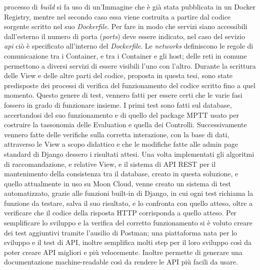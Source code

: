 processo di \textit{build} si fa uso di un'Immagine che è già stata pubblicata in un Docker Registry, mentre nel secondo caso essa viene costruita 
a partire dal codice sorgente scritto nel suo \textit{Dockerfile}. Per fare in modo che servizi siano accessibili dall'esterno il numero di porta 
(\textit{ports}) deve essere indicato, nel caso del sevizio \textit{api} ciò è specificato all'interno del \textit{Dockerfile}.\hfill\break
Le \textit{networks} definiscono le regole di comunicazione tra i Container, e tra i Container e gli host; delle reti in comune 
permettono a diversi servizi di essere visibili l'uno con l'altro.
%
\vspace{1.5 cm}
\hfill\break
Durante la scrittura delle View e delle altre parti del codice, proposta in questa tesi, sono state predisposte 
dei processi di verifica del funzionamento del codice scritto fino a quel momento. Questo genere di test, vennero fatti 
per essere certi che le varie fasi fossero in grado di funzionare insieme.\hfill\break
I primi test sono fatti sul database, accertandosi del suo funzionamento e di quello del package MPTT usato 
per costruire la tassonomia delle Evaluation e quella dei Controlli. Successivamente vennero fatte delle verifiche sulla 
corretta interazione, con la base di dati, attraverso le View a scopo didattico e che le modifiche fatte alle admin page 
standard di Django dessero i risultati attesi. Una volta implementati gli algoritmi di raccomandazione, e relative View, 
e il sistema di API REST per il mantenimento della consistenza tra il database, creato in questa soluzione, e quello 
attualmente in uso su Moon Cloud, venne creato un sistema di test automatizzato, grazie alle funzioni built-in di Django, 
in cui ogni test richiama la funzione da testare, salva il suo risultato, e lo confronta con quello atteso, 
oltre a verificare che il codice della risposta HTTP corrisponda a quello atteso.\hfill\break
Per semplificare lo sviluppo e la verifica del corretto funzionamento si è voluto creare dei test aggiuntivi tramite 
l'ausilio di Postman; una piattaforma nata per lo sviluppo e il test di API, inoltre semplifica molti step per il loro 
sviluppo così da poter creare API migliori e più velocemente. Inoltre permette di generare una documentazione 
machine-readable così da rendere le API più facili da usare.
